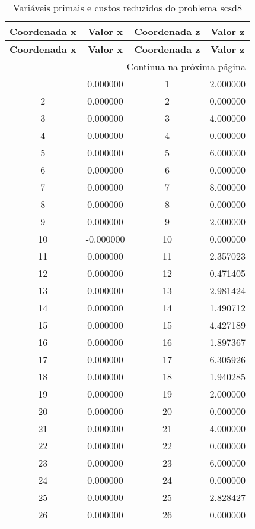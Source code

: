 \documentclass[12pt]{article}
\begin{document}
\begin{longtable}{@{}cccc@{}}
\caption{Variáveis primais e custos reduzidos do problema scsd8} \\
\toprule
\textbf{Coordenada x} & \textbf{Valor x} & \textbf{Coordenada z} & \textbf{Valor z} \\
\midrule
\endfirsthead

\toprule
\textbf{Coordenada x} & \textbf{Valor x} & \textbf{Coordenada z} & \textbf{Valor z} \\
\midrule
\endhead

\midrule \multicolumn{4}{r}{{Continua na próxima página}} \\ \midrule
\endfoot

\bottomrule
\endlastfoot
1 & 0.000000 & 1 & 2.000000 \\
2 & 0.000000 & 2 & 0.000000 \\
3 & 0.000000 & 3 & 4.000000 \\
4 & 0.000000 & 4 & 0.000000 \\
5 & 0.000000 & 5 & 6.000000 \\
6 & 0.000000 & 6 & 0.000000 \\
7 & 0.000000 & 7 & 8.000000 \\
8 & 0.000000 & 8 & 0.000000 \\
9 & 0.000000 & 9 & 2.000000 \\
10 & -0.000000 & 10 & 0.000000 \\
11 & 0.000000 & 11 & 2.357023 \\
12 & 0.000000 & 12 & 0.471405 \\
13 & 0.000000 & 13 & 2.981424 \\
14 & 0.000000 & 14 & 1.490712 \\
15 & 0.000000 & 15 & 4.427189 \\
16 & 0.000000 & 16 & 1.897367 \\
17 & 0.000000 & 17 & 6.305926 \\
18 & 0.000000 & 18 & 1.940285 \\
19 & 0.000000 & 19 & 2.000000 \\
20 & 0.000000 & 20 & 0.000000 \\
21 & 0.000000 & 21 & 4.000000 \\
22 & 0.000000 & 22 & 0.000000 \\
23 & 0.000000 & 23 & 6.000000 \\
24 & 0.000000 & 24 & 0.000000 \\
25 & 0.000000 & 25 & 2.828427 \\
26 & 0.000000 & 26 & 0.000000 \\

\end{longtable}
\end{document}
